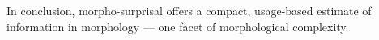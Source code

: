 \documentclass[USenglish]{article}
\providecommand{\DIFdelbegin}{} %
\providecommand{\DIFscaledelfig}{0.5}
\newlength{\DIFdelgraphicswidth} %
\newlength{\DIFdelgraphicsheight} %
\providecommand{\DIFdelincludegraphics}[2][]{%
\sbox{\DIFdelgraphicsbox}{\DIFOincludegraphics[#1]{#2}}%
\settoboxwidth{\DIFdelgraphicswidth}{\DIFdelgraphicsbox} %
\settoboxtotalheight{\DIFdelgraphicsheight}{\DIFdelgraphicsbox} %
\scalebox{\DIFscaledelfig}{%
\parbox[b]{\DIFdelgraphicswidth}{\usebox{\DIFdelgraphicsbox}\\[-\baselineskip] \rule{\DIFdelgraphicswidth}{0em}}\llap{\resizebox{\DIFdelgraphicswidth}{\DIFdelgraphicsheight}{%
\setlength{\unitlength}{\DIFdelgraphicswidth}%
\begin{picture}(1,1)%
\thicklines\linethickness{2pt} %
{\color[rgb]{1,0,0}\put(0,0){\framebox(1,1){}}}%
{\color[rgb]{1,0,0}\put(0,0){\line( 1,1){1}}}%
{\color[rgb]{1,0,0}\put(0,1){\line(1,-1){1}}}%
\end{picture}%
}\hspace*{3pt}}} %
} %
\DeclareRobustCommand{\DIFdelbegin}{\DIFOdelbegin \let\includegraphics\DIFdelincludegraphics} %
\begin{document}
In conclusion, morpho-surprisal offers a compact, usage-based estimate of information in morphology --- one facet of morphological complexity. 


\DIFdelbegin %


\end{document}
